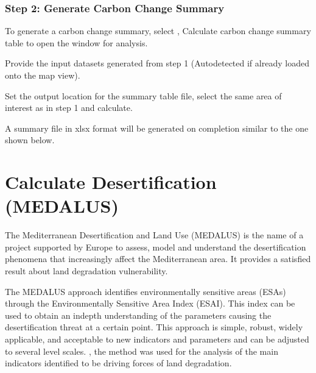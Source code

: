 \documentclass[letterpaper,10pt,english]{sphinxmanual}
\begin{document}
\subsection{Step 2: Generate Carbon Change Summary}
\label{\detokenize{Qgis_Plugin/Calculate_forest:step-2-generate-carbon-change-summary}}
\sphinxAtStartPar
To generate a carbon change summary, select , Calculate carbon change summary table to open the window
for analysis.


\sphinxAtStartPar
Provide the input datasets generated from step 1 (Auto\sphinxhyphen{}detected if already loaded onto the map view).


\sphinxAtStartPar
Set the output location for the summary table file, select the same area of interest as in step 1 and calculate.


\sphinxAtStartPar
A summary file in xlsx format will be generated on completion similar to the one shown below.


\sphinxstepscope


\chapter{Calculate Desertification (MEDALUS)}
\label{\detokenize{Qgis_Plugin/Calculate_medalus:calculate-desertification-medalus}}\label{\detokenize{Qgis_Plugin/Calculate_medalus::doc}}
\sphinxAtStartPar
The Mediterranean Desertification and Land Use (MEDALUS) is the name of a project supported
by Europe to assess, model and understand the desertification phenomena that increasingly
affect the Mediterranean area. It provides a satisfied result about land degradation vulnerability.

\sphinxAtStartPar
The MEDALUS approach identifies environmentally sensitive areas (ESAs) through the Environmentally
Sensitive Area Index (ESAI). This index can be used to obtain an in\sphinxhyphen{}depth understanding of the parameters
causing the desertification threat at a certain point. This approach is simple, robust, widely applicable,
and acceptable to new indicators and parameters and can be adjusted to several level scales. , the method
was used for the analysis of the main indicators identified to be driving forces of land degradation.
\end{document}
